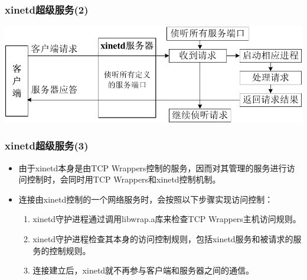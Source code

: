 \documentclass[xcolor=svgnames,presentation]{beamer}
\begin{document}
\begin{frame}
\frametitle{xinetd超级服务(2)}
\label{sec-7-7}
\label{sec-7-7-1}

\includegraphics[width=.9\linewidth]{img/xinetd.png}
\end{frame}
\begin{frame}
\frametitle{xinetd超级服务(3)}
\label{sec-7-8}
\begin{itemize}

\item 由于xinetd本身是由TCP Wrappers控制的服务，因而对其管理的服务进行访问控制时，会同时用TCP Wrappers和xinetd控制机制。
\label{sec-7-8-1}%

\item 连接由xinetd控制的一个网络服务时，会按照以下步骤实现访问控制：
\label{sec-7-8-2}%
\begin{enumerate}
\item xinetd守护进程通过调用libwrap.a库来检查TCP Wrappers主机访问规则。
\item xinetd守护进程检查其本身的访问控制规则，包括xinetd服务和被请求的服务的控制规则。
\item 连接建立后，xinetd就不再参与客户端和服务器之间的通信。
\end{enumerate}
\end{itemize} %
\end{frame}
\end{document}
